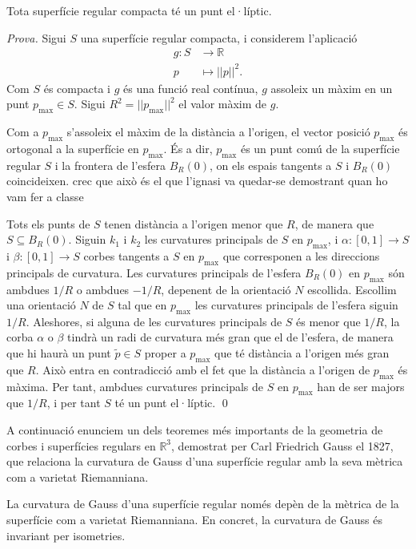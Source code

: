 \begin{teo}\label{teo:elliptic_point}
    Tota superfície regular compacta té un punt el·líptic.
\end{teo}
{
    \color{green!50!black}
    \textit{Prova.}
    Sigui $S$ una superfície regular compacta, i considerem l'aplicació 
    \begin{align*}
        g:S&\to\mathbb R\\
        p&\mapsto ||p||^2.
    \end{align*}
    Com $S$ és compacta i $g$ és una funció real contínua, $g$ assoleix un màxim en un punt $p_{\max}\in S$. Sigui $R^2 = ||p_{\max}||^2$ el valor màxim de $g$. 
    
    Com a $p_{\max}$ s'assoleix el màxim de la distància a l'origen, el vector posició $p_{\max}$ és ortogonal a la superfície en $p_{\max}$. És a dir, $p_{\max}$ és un punt comú de la superfície regular $S$ i la frontera de l'esfera $B_{R}(0)$, on els espais tangents a $S$ i $B_{R}(0)$ coincideixen. {\color{blue} crec que això és el que l'ignasi va quedar-se demostrant quan ho vam fer a classe}

    Tots els punts de $S$ tenen distància a l'origen menor que $R$, de manera que $S\subseteq B_{R}(0)$. Siguin $k_1$ i $k_2$ les curvatures principals de $S$ en $p_{\max}$, i $\alpha:[0,1]\to S$ i $\beta:[0,1]\to S$ corbes tangents a $S$ en $p_{\max}$ que corresponen a les direccions principals de curvatura. Les curvatures principals de l'esfera $B_{R}(0)$ en $p_{\max}$ són ambdues $1/R$ o ambdues $-1/R$, depenent de la orientació $N$ escollida. Escollim una orientació $N$ de $S$ tal que en $p_{\max}$ les curvatures principals de l'esfera siguin $1/R$. Aleshores, si alguna de les curvatures principals de $S$ és menor que $1/R$, la corba $\alpha$ o $\beta$ tindrà un radi de curvatura més gran que el de l'esfera, de manera que hi haurà un punt $\tilde p\in S$ proper a $p_{\max}$ que té distància a l'origen més gran que $R$. Això entra en contradicció amb el fet que la distància a l'origen de $p_{\max}$ és màxima. Per tant, ambdues curvatures principals de $S$ en $p_{\max}$ han de ser majors que $1/R$, i per tant $S$ té un punt el·líptic.
    \qed
}

A continuació enunciem un dels teoremes més importants de la geometria de corbes i superfícies regulars en $\mathbb R^3$, demostrat per Carl Friedrich Gauss el 1827, que relaciona la curvatura de Gauss d'una superfície regular amb la seva mètrica com a varietat Riemanniana.

\begin{teo}
    La curvatura de Gauss d'una superfície regular només depèn de la mètrica de la superfície com a varietat Riemanniana. En concret, la curvatura de Gauss és invariant per isometries. 
\end{teo}

